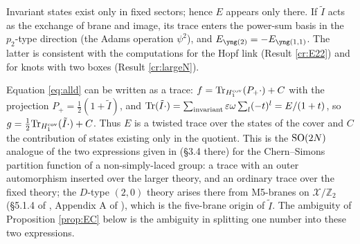\begin{remark}\label{rem:Esector}
Invariant states exist only in fixed sectors; hence $E$ appears only there. If $\tilde I$ acts as the exchange of brane and image, its trace enters the power-sum basis in the $p_2$-type direction (the Adams operation $\psi^2$), and $E_{\ytwo} = -E_{\yoneone}$. The latter is consistent with the computations for the Hopf link (Result \ref{cr:E22}) and for knots with two boxes (Result \ref{cr:largeN}).
\end{remark}

\begin{remark}\label{rem:trace}
Equation \eqref{eq:alld} can be written as a trace: $f = \mathrm{Tr}_{H_1^{\mathrm{cov}}}(P_+\cdot) + C$ with the projection $P_+ = \tfrac12(1 + \tilde I)$, and $\mathrm{Tr}(\tilde I\cdot) = \sum_{\text{invariant}}\varepsilon\omega\sum_l(-t)^l = E/(1+t)$, so $g = \tfrac12\mathrm{Tr}_{H_1^{\mathrm{cov}}}(\tilde I\cdot) + C$. Thus $E$ is a twisted trace over the states of the cover and $C$ the contribution of states existing only in the quotient. This is the $\mathrm{SO}(2N)$ analogue of the two expressions given in \cite{Witten11} (\S3.4 there) for the Chern--Simons partition function of a non-simply-laced group: a trace with an outer automorphism inserted over the larger theory, and an ordinary trace over the fixed theory; the $D$-type $(2,0)$ theory arises there from M5-branes on $\mathcal X/\mathbb{Z}_2$ (\S5.1.4 of \cite{Witten11}, Appendix A of \cite{AgSc12}), which is the five-brane origin of $\tilde I$. The ambiguity of Proposition \ref{prop:EC} below is the ambiguity in splitting one number into these two expressions.
\end{remark}

